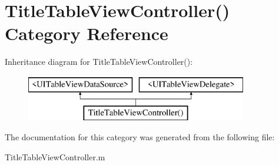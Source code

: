 \hypertarget{category_title_table_view_controller_07_08}{\section{Title\+Table\+View\+Controller() Category Reference}
\label{category_title_table_view_controller_07_08}
}
Inheritance diagram for Title\+Table\+View\+Controller()\+:\begin{figure}[H]
\begin{center}
\leavevmode
\includegraphics[height=2.000000cm]{category_title_table_view_controller_07_08}
\end{center}
\end{figure}


The documentation for this category was generated from the following file\+:\begin{DoxyCompactItemize}
\item 
Title\+Table\+View\+Controller.\+m\end{DoxyCompactItemize}
